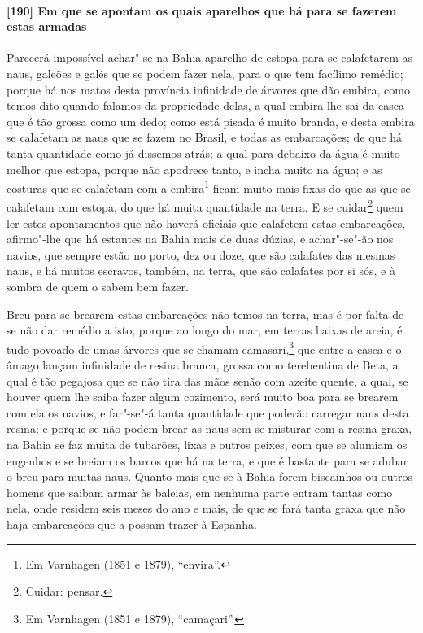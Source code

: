 \begin{linenumbers}
\paragraph{[190] Em que se apontam os quais aparelhos que há para se fazerem estas armadas}\quad
Parecerá impossível achar"-se na Bahia aparelho de estopa para se calafetarem as naus,
galeões e galés que se podem fazer nela, para o que tem facílimo remédio; porque há nos
matos desta província infinidade de árvores que dão embira, como temos dito quando falamos
da propriedade delas, a qual embira lhe sai da casca que é tão grossa como um dedo; como
está pisada é muito branda, e desta embira se calafetam as naus que se fazem no Brasil, e
todas as embarcações; de que há tanta quantidade como já dissemos atrás; a qual para
debaixo da água é muito melhor que estopa, porque não apodrece tanto, e incha muito na
água; e as costuras que se calafetam com a embira\footnote{ Em Varnhagen (1851 e 1879),
``envira''.} ficam muito mais fixas do que as que se calafetam com estopa, do que há muita
quantidade na terra. E se cuidar\footnote{ Cuidar: pensar.} quem ler estes apontamentos
que não haverá oficiais que calafetem estas embarcações, afirmo"-lhe que há
estantes na Bahia mais de duas dúzias, e achar"-se"-ão nos navios, que sempre estão no
porto, dez ou doze, que são calafates das mesmas naus, e há muitos escravos, também, na
terra, que são calafates por si sós, e à sombra de quem o sabem bem fazer.

Breu para se brearem estas embarcações não temos na terra, mas é por falta de se não dar
remédio a isto; porque ao longo do mar, em terras baixas de areia, é tudo povoado de umas
árvores que se chamam camasari,\footnote{ Em Varnhagen (1851 e 1879), ``camaçari''.} que
entre a casca e o âmago lançam infinidade de resina branca, grossa como terebentina de
Beta, a qual é tão pegajosa que se não tira das mãos senão com azeite quente, a qual, se
houver quem lhe saiba fazer algum cozimento, será muito boa para se brearem com ela os
navios, e far"-se"-á tanta quantidade que poderão carregar naus desta resina; e porque se
não podem brear as naus sem se misturar com a resina graxa, na Bahia se faz muita de
tubarões, lixas e outros peixes, com que se alumiam os engenhos e se breiam os barcos que
há na terra, e que é bastante para se adubar o breu para muitas naus. Quanto mais que se à
Bahia forem biscainhos ou outros homens que saibam armar às baleias, em nenhuma parte
entram tantas como nela, onde residem seis meses do ano e mais, de que se fará tanta graxa
que não haja embarcações que a possam trazer à Espanha.


\end{linenumbers}
